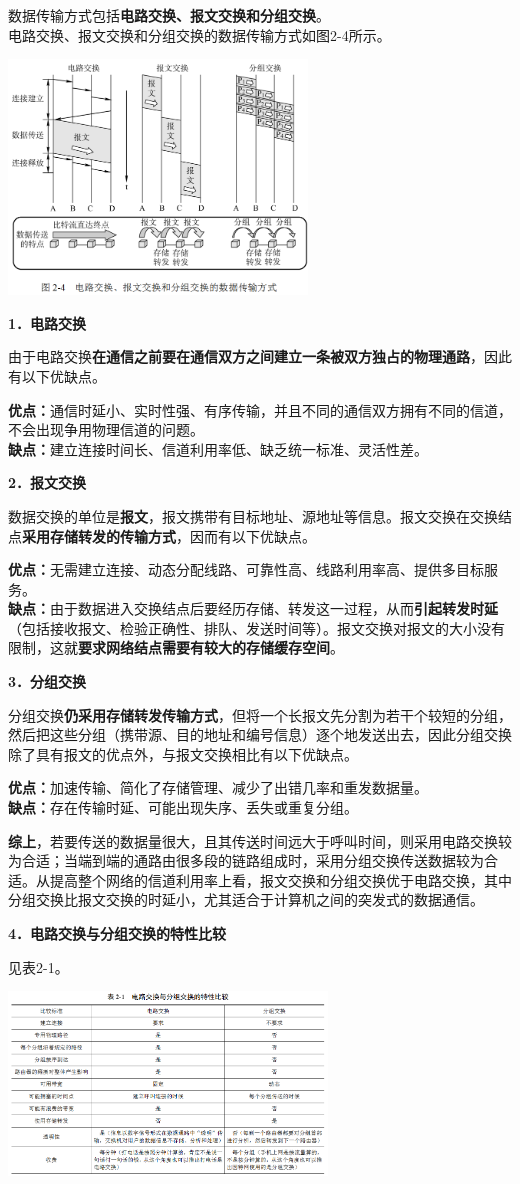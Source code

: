 数据传输方式包括\textbf{电路交换、报文交换和分组交换}。\\

电路交换、报文交换和分组交换的数据传输方式如图2-4所示。

\includegraphics[width=3.12500in,height=2.45833in]{png-jpeg-pics/6065ABA3503AAA626FC3D39C049E76BD.png}

\textbf{{1．电路交换}}

由于电路交换{\textbf{在通信之前要在通信双方之间建立一条被双方独占的物理通路}}，因此有以下优缺点。

\textbf{优点：}通信时延小、实时性强、有序传输，并且不同的通信双方拥有不同的信道，不会出现争用物理信道的问题。\\
\textbf{缺点：}建立连接时间长、信道利用率低、缺乏统一标准、灵活性差。

\textbf{{2．报文交换}}

数据交换的单位是\textbf{报文}，报文携带有目标地址、源地址等信息。报文交换在交换结点\textbf{{采用存储转发的传输方式}}，因而有以下优缺点。

\textbf{优点：}无需建立连接、动态分配线路、可靠性高、线路利用率高、提供多目标服务。\\
\textbf{缺点：}由于数据进入交换结点后要经历存储、转发这一过程，从而\textbf{引起转发时延}（包括接收报文、检验正确性、排队、发送时间等）。报文交换对报文的大小没有限制，这就\textbf{要求网络结点需要有较大的存储缓存空间}。

\textbf{{3．分组交换}}

分组交换\textbf{{仍采用存储转发传输方式}}，但将一个长报文先分割为若干个较短的分组，然后把这些分组（携带源、目的地址和编号信息）逐个地发送出去，因此分组交换除了具有报文的优点外，与报文交换相比有以下优缺点。

\textbf{优点：}加速传输、简化了存储管理、减少了出错几率和重发数据量。\\
\textbf{缺点：}存在传输时延、可能出现失序、丢失或重复分组。

\textbf{综上}，若要传送的数据量很大，且其传送时间远大于呼叫时间，则采用电路交换较为合适；当端到端的通路由很多段的链路组成时，采用分组交换传送数据较为合适。从提高整个网络的信道利用率上看，报文交换和分组交换优于电路交换，其中分组交换比报文交换的时延小，尤其适合于计算机之间的突发式的数据通信。

\textbf{{4．电路交换与分组交换的特性比较}}

见表2-1。

\includegraphics[width=3.33333in,height=1.92708in]{png-jpeg-pics/5C795719AC1A3CA85C9C50184BF417B7.png}
